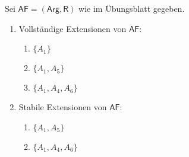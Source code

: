 Sei $\mathsf{AF}=(\mathsf{Arg}, \mathsf{R})$ wie im Übungsblatt gegeben.

\begin{enumerate}
	\item Vollständige Extensionen von $\mathsf{AF}$:
	\begin{enumerate}
		\item $\{A_1\}$
		\item $\{A_1, A_5\}$
		\item $\{A_1, A_4, A_6\}$
	\end{enumerate}
	
	\item Stabile Extensionen von $\mathsf{AF}$:
	\begin{enumerate}
		\item $\{A_1, A_5\}$
		\item $\{A_1, A_4, A_6\}$
	\end{enumerate}
\end{enumerate}